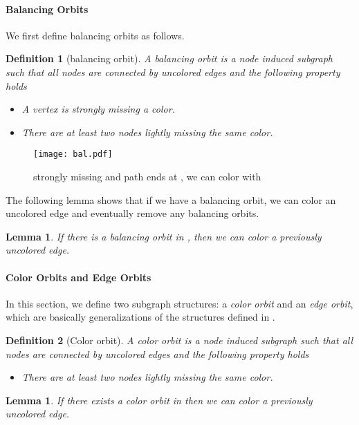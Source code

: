 \documentclass[titlepage, 11pt]{article}
\newtheorem{definition}{Definition}
\newtheorem{lemma}[theorem]{Lemma}
\begin{document}
\paragraph{Balancing Orbits}
\vspace{5pt}
We first define balancing orbits as follows.
\begin{definition}[balancing orbit] 
\label{def:balancing}
A \emph{balancing orbit}  is a node induced subgraph such that 
all nodes  are connected by uncolored edges and the following property holds
\begin{itemize}
\item A vertex  is strongly missing a color.
\item There are at least two nodes  lightly missing the same color.
\end{itemize}
\end{definition}
\begin{figure}
\centering
\texttt{[image: bal.pdf]}
\caption{ strongly missing  and path  ends at , we can color  with }
\label{fig:bal}
\end{figure}
\vspace{0.2in}
The following lemma shows that if we have a balancing orbit, we can color
an uncolored edge and eventually remove any balancing orbits.
\begin{lemma}\label{lemma:balancing}
If there is a balancing orbit in , then we can color a previously uncolored edge.
\end{lemma}

\paragraph{Color Orbits and Edge Orbits}
In this section, we define two subgraph structures: a \emph{color orbit} and an \emph{edge orbit}, 
which are basically generalizations of the structures defined in \cite{sanders05}.

\begin{definition}[Color orbit]
\label{def:color}
A \emph{color orbit}  is a node induced subgraph such that
all nodes  are connected by uncolored edges and the following property holds
\begin{itemize}
\item There are at least two nodes  lightly missing the same color.
\end{itemize}

\end{definition}

\begin{lemma}\label{lemma:balancing2}
\cite{sanders05} If there exists a color orbit in  then we can color a previously uncolored edge.
\end{lemma}
\end{document}

